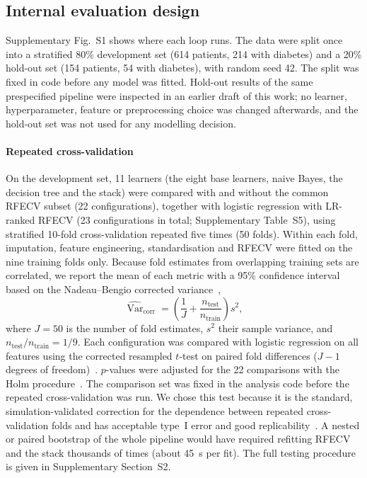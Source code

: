 \subsection{Internal evaluation design}
Supplementary Fig.~S1 shows where each loop runs. The data were split once into a stratified 80\% development set (614 patients, 214 with diabetes) and a 20\% hold-out set (154 patients, 54 with diabetes), with random seed 42. The split was fixed in code before any model was fitted. Hold-out results of the same prespecified pipeline were inspected in an earlier draft of this work; no learner, hyperparameter, feature or preprocessing choice was changed afterwards, and the hold-out set was not used for any modelling decision.

\paragraph{Repeated cross-validation}
On the development set, 11 learners (the eight base learners, naive Bayes, the decision tree and the stack) were compared with and without the common RFECV subset (22 configurations), together with logistic regression with LR-ranked RFECV (23 configurations in total; Supplementary Table~S5), using stratified 10-fold cross-validation repeated five times (50 folds). Within each fold, imputation, feature engineering, standardisation and RFECV were fitted on the nine training folds only. Because fold estimates from overlapping training sets are correlated, we report the mean of each metric with a 95\% confidence interval based on the Nadeau--Bengio corrected variance~\cite{nadeau2003inference},
\begin{equation}
  \widehat{\operatorname{Var}}_{\mathrm{corr}} = \left(\frac{1}{J} + \frac{n_{\mathrm{test}}}{n_{\mathrm{train}}}\right) s^2,
  \label{eq:corrected}
\end{equation}
where $J=50$ is the number of fold estimates, $s^2$ their sample variance, and $n_{\mathrm{test}}/n_{\mathrm{train}} = 1/9$. Each configuration was compared with logistic regression on all features using the corrected resampled $t$-test on paired fold differences ($J-1$ degrees of freedom)~\cite{nadeau2003inference,bouckaert2004replicability}. $p$-values were adjusted for the 22 comparisons with the Holm procedure~\cite{holm1979}. The comparison set was fixed in the analysis code before the repeated cross-validation was run. We chose this test because it is the standard, simulation-validated correction for the dependence between repeated cross-validation folds and has acceptable type~I error and good replicability~\cite{nadeau2003inference,bouckaert2004replicability}. A nested or paired bootstrap of the whole pipeline would have required refitting RFECV and the stack thousands of times (about 45~s per fit). The full testing procedure is given in Supplementary Section~S2.

